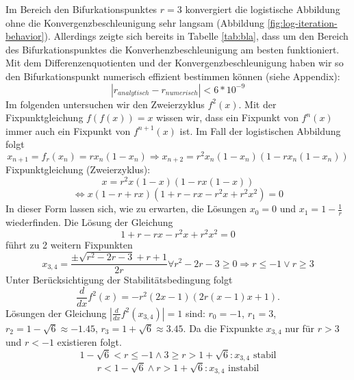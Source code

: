 \documentclass[12pt,a4paper]{article}
\begin{document}
Im Bereich den Bifurkationspunktes $r=3$ konvergiert die logistische Abbildung ohne die Konvergenzbeschleunigung sehr langsam (Abbildung \ref{fig:log-iteration-behavior}). Allerdings
zeigte sich bereits in Tabelle \ref{tab:bla}, dass um den Bereich des Bifurkationspunktes die Konverhenzbeschleunigung am besten funktioniert. Mit dem Differenzenquotienten und der Konvergenzbeschleunigung haben wir so den Bifurkationspunkt numerisch effizient bestimmen können (siehe Appendix):
\begin{equation}
|r_{analytisch}-r_{numerisch}| < 6 * 10^{-9}
\end{equation}
\newpage
Im folgenden untersuchen wir den Zweierzyklus $f^2(x)$. Mit der Fixpunktgleichung $f(f(x))=x$ wissen wir, dass ein Fixpunkt von $f^n(x)$ immer auch ein Fixpunkt von $f^{n+1}(x)$ ist. Im Fall der logistischen Abbildung folgt
\begin{equation}
x_{n+1}=f_r(x_n)=rx_n(1-x_n)
\Rightarrow x_{n+2}=r^2x_n(1-x_n)(1-rx_n(1-x_n))\end{equation}
\newline
Fixpunktgleichung (Zweierzyklus):
\begin{equation}
x=r^2x(1-x)(1-rx(1-x))
\end{equation}
\begin{equation}
\Leftrightarrow x(1-r+rx)(1+r-rx-r^2x+r^2x^2)=0
\end{equation}
In dieser Form lassen sich, wie zu erwarten, die Lösungen $x_0=0$ und $x_1=1-\frac{1}{r}$ wiederfinden.
Die Lösung der Gleichung
\begin{equation}
1+r-rx-r^2x+r^2x^2=0
\end{equation}
führt zu 2 weitern Fixpunkten
\begin{equation}
x_{3,4}=\frac{\pm\sqrt{r^2-2 r-3}+r+1}{2 r} \forall r^2-2 r-3 \geq 0 \Rightarrow r \leq -1 \vee r \geq 3
\end{equation}
Unter Berücksichtigung der Stabilitätsbedingung folgt
\begin{equation}
\frac{d}{dx}f^2(x)=-r^2(2x-1)(2r(x-1)x+1).
\end{equation}
Lösungen der Gleichung $|\frac{d}{dx}f^2(x_{3,4})|=1$ sind: $r_0=-1$, $r_1=3$, $r_2=1-\sqrt{6}\approx-1.45$, $r_3=1+\sqrt{6}\approx3.45$.
\newline
Da die Fixpunkte $x_{3,4}$ nur für $r>3$ und $r<-1$ existieren folgt.
\begin{equation}1-\sqrt{6}< r \leq -1 \wedge 3 \geq r > 1+\sqrt{6}: x_{3,4} \text{ stabil}
\end{equation}
\begin{equation}r < 1-\sqrt{6} \wedge r>1+\sqrt{6}: x_{3,4} \text{ instabil}
\end{equation}
\end{document}
